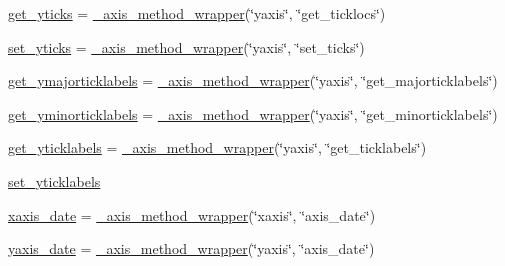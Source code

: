 \begin{DoxyCompactItemize}
\hyperlink{classmatplotlib_1_1axes_1_1__base_1_1__AxesBase_ac2bafe327dd0a410c18b9e3c5efd255f}{get\+\_\+yticks} = \hyperlink{classmatplotlib_1_1axes_1_1__base_1_1__axis__method__wrapper}{\+\_\+axis\+\_\+method\+\_\+wrapper}(\char`\"{}yaxis\char`\"{}, \char`\"{}get\+\_\+ticklocs\char`\"{})
\item 
\hyperlink{classmatplotlib_1_1axes_1_1__base_1_1__AxesBase_a3b6bd0b3ad7207dcd8f283a43b769a70}{set\+\_\+yticks} = \hyperlink{classmatplotlib_1_1axes_1_1__base_1_1__axis__method__wrapper}{\+\_\+axis\+\_\+method\+\_\+wrapper}(\char`\"{}yaxis\char`\"{}, \char`\"{}set\+\_\+ticks\char`\"{})
\item 
\hyperlink{classmatplotlib_1_1axes_1_1__base_1_1__AxesBase_ac66ae28161d1533781ebbf14681edb5a}{get\+\_\+ymajorticklabels} = \hyperlink{classmatplotlib_1_1axes_1_1__base_1_1__axis__method__wrapper}{\+\_\+axis\+\_\+method\+\_\+wrapper}(\char`\"{}yaxis\char`\"{}, \char`\"{}get\+\_\+majorticklabels\char`\"{})
\item 
\hyperlink{classmatplotlib_1_1axes_1_1__base_1_1__AxesBase_af1bbf070826c94e254b7bc0f3015c610}{get\+\_\+yminorticklabels} = \hyperlink{classmatplotlib_1_1axes_1_1__base_1_1__axis__method__wrapper}{\+\_\+axis\+\_\+method\+\_\+wrapper}(\char`\"{}yaxis\char`\"{}, \char`\"{}get\+\_\+minorticklabels\char`\"{})
\item 
\hyperlink{classmatplotlib_1_1axes_1_1__base_1_1__AxesBase_a8eebfad0fd683d64b0bf552995ad1771}{get\+\_\+yticklabels} = \hyperlink{classmatplotlib_1_1axes_1_1__base_1_1__axis__method__wrapper}{\+\_\+axis\+\_\+method\+\_\+wrapper}(\char`\"{}yaxis\char`\"{}, \char`\"{}get\+\_\+ticklabels\char`\"{})
\item 
\hyperlink{classmatplotlib_1_1axes_1_1__base_1_1__AxesBase_a5e610c7658e7284dffa0a4b115a50ce7}{set\+\_\+yticklabels}
\item 
\hyperlink{classmatplotlib_1_1axes_1_1__base_1_1__AxesBase_af715e361c7a90a8512cdb4633d67b355}{xaxis\+\_\+date} = \hyperlink{classmatplotlib_1_1axes_1_1__base_1_1__axis__method__wrapper}{\+\_\+axis\+\_\+method\+\_\+wrapper}(\char`\"{}xaxis\char`\"{}, \char`\"{}axis\+\_\+date\char`\"{})
\item 
\hyperlink{classmatplotlib_1_1axes_1_1__base_1_1__AxesBase_a678a7fa9e1dc60857f1a9dc5306e2e4a}{yaxis\+\_\+date} = \hyperlink{classmatplotlib_1_1axes_1_1__base_1_1__axis__method__wrapper}{\+\_\+axis\+\_\+method\+\_\+wrapper}(\char`\"{}yaxis\char`\"{}, \char`\"{}axis\+\_\+date\char`\"{})
\end{DoxyCompactItemize}


